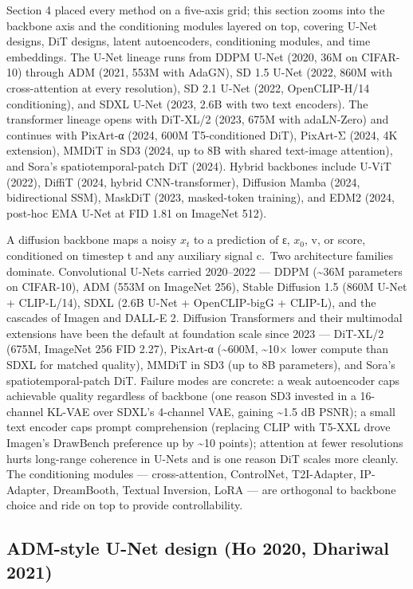 Section 4 placed every method on a five-axis grid; this section zooms into the backbone axis and the conditioning modules layered on top, covering U-Net designs, DiT designs, latent autoencoders, conditioning modules, and time embeddings. The U-Net lineage runs from DDPM U-Net (2020, 36M on CIFAR-10) through ADM (2021, 553M with AdaGN), SD 1.5 U-Net (2022, 860M with cross-attention at every resolution), SD 2.1 U-Net (2022, OpenCLIP-H/14 conditioning), and SDXL U-Net (2023, 2.6B with two text encoders). The transformer lineage opens with DiT-XL/2 (2023, 675M with adaLN-Zero) and continues with PixArt-α (2024, 600M T5-conditioned DiT), PixArt-Σ (2024, 4K extension), MMDiT in SD3 (2024, up to 8B with shared text-image attention), and Sora's spatiotemporal-patch DiT (2024). Hybrid backbones include U-ViT (2022), DiffiT (2024, hybrid CNN-transformer), Diffusion Mamba (2024, bidirectional SSM), MaskDiT (2023, masked-token training), and EDM2 (2024, post-hoc EMA U-Net at FID 1.81 on ImageNet 512).

A diffusion backbone maps a noisy \(x_t\) to a prediction of ε, \(x_0\), v, or score, conditioned on timestep t and any auxiliary signal c.~Two architecture families dominate. Convolutional U-Nets carried 2020--2022 --- DDPM (\textasciitilde36M parameters on CIFAR-10), ADM (553M on ImageNet 256), Stable Diffusion 1.5 (860M U-Net + CLIP-L/14), SDXL (2.6B U-Net + OpenCLIP-bigG + CLIP-L), and the cascades of Imagen and DALL-E 2. Diffusion Transformers and their multimodal extensions have been the default at foundation scale since 2023 --- DiT-XL/2 (675M, ImageNet 256 FID 2.27), PixArt-α (\textasciitilde600M, \textasciitilde10× lower compute than SDXL for matched quality), MMDiT in SD3 (up to 8B parameters), and Sora's spatiotemporal-patch DiT. Failure modes are concrete: a weak autoencoder caps achievable quality regardless of backbone (one reason SD3 invested in a 16-channel KL-VAE over SDXL's 4-channel VAE, gaining \textasciitilde1.5 dB PSNR); a small text encoder caps prompt comprehension (replacing CLIP with T5-XXL drove Imagen's DrawBench preference up by \textasciitilde10 points); attention at fewer resolutions hurts long-range coherence in U-Nets and is one reason DiT scales more cleanly. The conditioning modules --- cross-attention, ControlNet, T2I-Adapter, IP-Adapter, DreamBooth, Textual Inversion, LoRA --- are orthogonal to backbone choice and ride on top to provide controllability.

\subsection{ADM-style U-Net design (Ho 2020, Dhariwal 2021)}\label{adm-style-u-net-design-ho-2020-dhariwal-2021}

